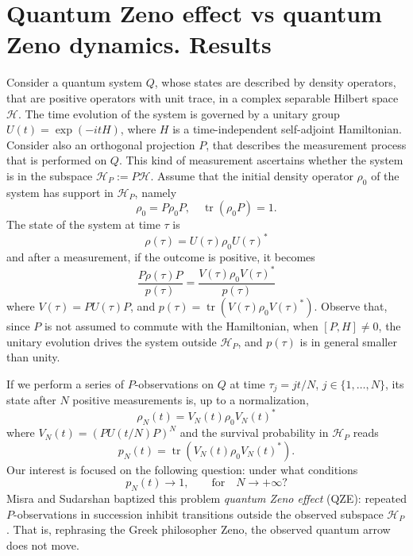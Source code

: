 \documentclass[aip,jmp,12pt
]{revtex4}
\newcommand{\tr}{\mathop{\mathrm{tr}}\nolimits}
\theoremstyle{definition}
\begin{document}
\section{\label{sec:results}Quantum Zeno effect vs quantum Zeno dynamics. Results}


Consider a quantum system $Q$, whose states are described by density operators, that are positive operators with unit trace, in a complex separable Hilbert space
$\mathcal{H}$.
The time evolution of the system is governed by a unitary group
$U(t)=\exp(-itH)$, where $H$ is a time-independent self-adjoint Hamiltonian.
Consider also an orthogonal projection $P$, that describes the
measurement process that is performed on $Q$.
This kind of measurement ascertains whether the system is in the
subspace $\mathcal{H}_{P}:=P\mathcal{H}$.
Assume that the initial
density operator $\rho_{0}$
of the system has support in $\mathcal{H}_{P}$, namely
\begin{equation*}
\rho_{0}=P\rho_{0}P, \quad \tr(\rho_{0}P)=1.
\end{equation*}
The state of the system at time $\tau$ is
\begin{equation*}
\rho(\tau)=U(\tau)\rho_{0}U(\tau)^{*}
\end{equation*}
and after a measurement, if the outcome is positive, it becomes
\[
\frac{P\rho(\tau)P}{p(\tau)}=\frac{V(\tau)\rho_{0}V(\tau)^{*}}{p(\tau)}
\]
where $V(\tau)=PU(\tau)P$, and $p(\tau)=
\tr(V(\tau)\rho_{0}V(\tau)^{*})$. Observe that, since $P$ is not
assumed to commute with the Hamiltonian, when $[P,H]\neq 0$, the
unitary evolution drives the system outside $\mathcal{H}_{P}$, and
$p(\tau)$ is in general smaller than unity.

If we perform a series of $P$-observations on $Q$ at time
$\tau_{j}=jt/N$, $j \in \{1, \ldots, N\}$, its state after $N$
positive measurements is, up to a normalization,
\[
\rho_{N}(t)=V_{N}(t)\rho_{0}V_{N}(t)^{*}
\]
where $V_{N}(t)=(PU(t/N)P)^N$ and the survival probability in
$\mathcal{H}_{P}$ reads
\begin{equation}
\label{eq:pN(t)}
p_{N}(t)= \tr (V_{N}(t)\rho_{0}V_{N}(t)^{*}).
\end{equation}
Our interest is focused on the following question: under what
conditions
\begin{equation}
p_{N}(t) \to 1, \qquad \text{for} \quad N \to +\infty?
\label{eq:QZEdef}
\end{equation}
Misra and Sudarshan \cite{misra}  baptized this problem \emph{quantum Zeno effect} (QZE): repeated $P$-observations in succession inhibit transitions
outside the observed subspace $\mathcal{H}_{P}$. That is, rephrasing the Greek philosopher Zeno, the observed quantum arrow does not move.
\end{document}
